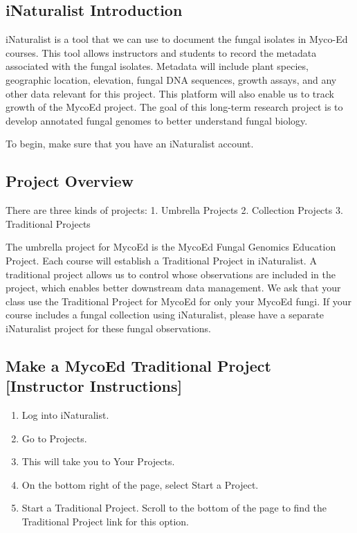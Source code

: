 \documentclass[
  letterpaper,
  DIV=11,
  numbers=noendperiod]{scrreprt}
\providecommand{\tightlist}{%
  \setlength{\itemsep}{0pt}\setlength{\parskip}{0pt}}
\begin{document}

\subsection*{iNaturalist Introduction}\label{inaturalist-introduction}

iNaturalist is a tool that we can use to document the fungal isolates in
Myco-Ed courses. This tool allows instructors and students to record the
metadata associated with the fungal isolates. Metadata will include
plant species, geographic location, elevation, fungal DNA sequences,
growth assays, and any other data relevant for this project. This
platform will also enable us to track growth of the MycoEd project. The
goal of this long-term research project is to develop annotated fungal
genomes to better understand fungal biology.

To begin, make sure that you have an iNaturalist account.

\subsection*{Project Overview}\label{project-overview}

There are three kinds of projects: 1. Umbrella Projects 2. Collection
Projects 3. Traditional Projects

The umbrella project for MycoEd is the MycoEd Fungal Genomics Education
Project. Each course will establish a Traditional Project in
iNaturalist. A traditional project allows us to control whose
observations are included in the project, which enables better
downstream data management. We ask that your class use the Traditional
Project for MycoEd for only your MycoEd fungi. If your course includes a
fungal collection using iNaturalist, please have a separate iNaturalist
project for these fungal observations.

\subsection*{Make a MycoEd Traditional Project {[}Instructor
Instructions{]}}\label{make-a-mycoed-traditional-project-instructor-instructions}

\begin{enumerate}
\def\labelenumi{\arabic{enumi}.}
\tightlist
\item
  Log into iNaturalist.
\item
  Go to Projects.
\item
  This will take you to Your Projects.
\item
  On the bottom right of the page, select Start a Project.
\item
  Start a Traditional Project. Scroll to the bottom of the page to find
  the Traditional Project link for this option.
\end{enumerate}
\end{document}
